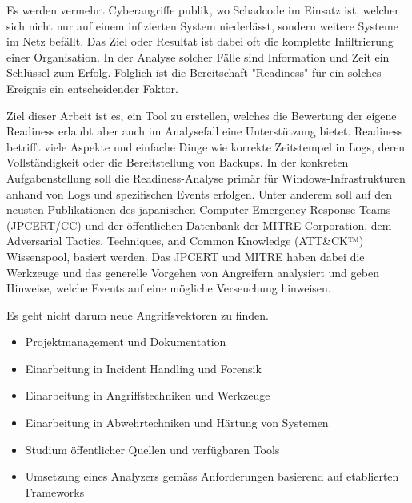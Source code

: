 \thispagestyle{plain}
\renewcommand\section{\stdsection}

Es werden vermehrt Cyberangriffe publik, wo Schadcode im Einsatz ist, welcher sich nicht nur auf einem infizierten System niederlässt, sondern weitere Systeme im Netz befällt. Das Ziel oder Resultat ist dabei oft die komplette Infiltrierung einer Organisation. In der Analyse solcher Fälle sind Information und Zeit ein Schlüssel zum Erfolg. Folglich ist die Bereitschaft "Readiness" für ein solches Ereignis ein entscheidender Faktor.

Ziel dieser Arbeit ist es, ein Tool zu erstellen, welches die Bewertung der eigene Readiness erlaubt aber auch im Analysefall eine Unterstützung bietet. Readiness betrifft viele Aspekte und einfache Dinge wie korrekte Zeitstempel in Logs, deren Vollständigkeit oder die Bereitstellung von Backups. In der konkreten Aufgabenstellung soll die Readiness-Analyse primär für Windows-Infrastrukturen anhand von Logs und spezifischen Events erfolgen. Unter anderem soll auf den neusten Publikationen des japanischen Computer Emergency Response Teams (JPCERT/CC) und der öffentlichen Datenbank der MITRE Corporation, dem Adversarial Tactics, Techniques, and Common Knowledge (ATT\&CK™) Wissenspool, basiert werden. Das JPCERT und MITRE haben dabei die Werkzeuge und das generelle Vorgehen von Angreifern analysiert und geben Hinweise, welche Events auf eine mögliche Verseuchung hinweisen.

Es geht nicht darum neue Angriffsvektoren zu finden.

\begin{itemize}
    \item Projektmanagement und Dokumentation
    \item Einarbeitung in Incident Handling und Forensik
    \item Einarbeitung in Angriffstechniken und Werkzeuge
    \item Einarbeitung in Abwehrtechniken und Härtung von Systemen
    \item Studium öffentlicher Quellen und verfügbaren Tools
    \item Umsetzung eines Analyzers gemäss Anforderungen basierend auf etablierten Frameworks    
\end{itemize}


